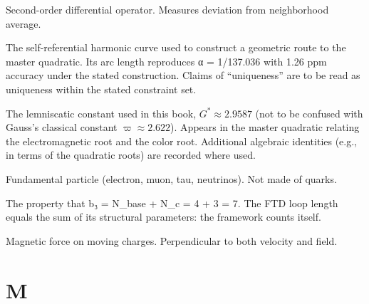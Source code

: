 \documentclass[
  11pt,
  letterpaper,
  twoside,
  openany]{book}
\makeatletter
\providecommand{\tightlist}{%
  \setlength{\itemsep}{0pt}\setlength{\parskip}{0pt}}
\let\orig@section\section
\renewcommand{\section}{\needspace{8\baselineskip}\orig@section}
\makeatother
\begin{document}
\begin{description}
\tightlist
\item[\textbf{Laplacian}]
Second-order differential operator. Measures deviation from neighborhood
average.
\item[\textbf{Lemniscate-Alpha Curve}]
The self-referential harmonic curve used to construct a geometric route
to the master quadratic. Its arc length reproduces α = 1/137.036 with
1.26 ppm accuracy under the stated construction. Claims of
``uniqueness'' are to be read as uniqueness within the stated constraint
set.
\item[**Lemniscatic Constant (G*)**]
The lemniscatic constant used in this book, \(G^*\approx 2.9587\) (not
to be confused with Gauss's classical constant \(\varpi\approx 2.622\)).
Appears in the master quadratic relating the electromagnetic root and
the color root. Additional algebraic identities (e.g., in terms of the
quadratic roots) are recorded where used.
\item[\textbf{Lepton}]
Fundamental particle (electron, muon, tau, neutrinos). Not made of
quarks.
\item[\textbf{Loop Self-Enumeration}]
The property that b₃ = N\_base + N\_c = 4 + 3 = 7. The FTD loop length
equals the sum of its structural parameters: the framework counts
itself.
\item[\textbf{Lorentz Force}]
Magnetic force on moving charges. Perpendicular to both velocity and
field.
\end{description}

\section{M}\label{m}
\end{document}

